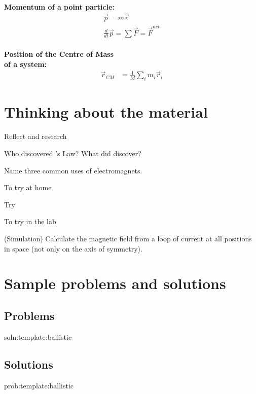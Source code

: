 \newpage
\begin{importantEquations}
\medskip
\begin{multicols}{2}
\textbf{Momentum of a point particle:}
\begin{align*}
\vec p = m\vec v \\
\frac{d}{dt}\vec p = \sum \vec F = \vec F^{net}
\end{align*}
\columnbreak
\\
\textbf{Position of the Centre of Mass \\ of a system:}
\begin{align*}
\vec r_{CM} &=\frac{1}{M}\sum_i m_i\vec r_i 
\end{align*}
\medskip
\end{multicols}
\end{importantEquations}

\newpage
\section{Thinking about the material}

\begin{chapteractivity}{Reflect and research}
{
\item Who discovered \ampere's Law? What did \amperesp discover?
\item Name three common uses of electromagnets.
}
\end{chapteractivity}

\begin{chapteractivity}{To try at home}
{
\item Try
}
\end{chapteractivity}

\begin{chapteractivity}{To try in the lab}
{
\item (Simulation) Calculate the magnetic field from a loop of current at all positions in space (not only on the axis of symmetry). 
}
\end{chapteractivity}

\newpage
\section{Sample problems and solutions}
\subsection{Problems}
\begin{problem}{soln:template:ballistic}{\label{prob:template:ballistic} 

}
\end{problem}

\newpage
\subsection{Solutions}
\begin{solution}{prob:template:ballistic}\label{soln:template:ballistic}

\end{solution}

